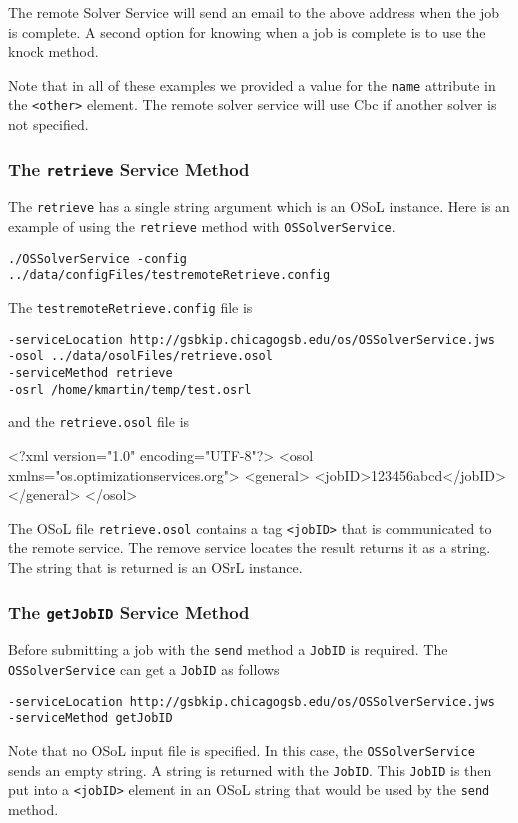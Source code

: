 \documentclass[11pt]{article}
\renewcommand{\_}{{\char"5F}}
\renewcommand{\{}{{\char"7B}}
\renewcommand{\}}{{\char"7D}}
\renewcommand{\^}{{\char"0D}}
\renewcommand{\'}{{\char"0D}}
\begin{document}
The remote Solver Service will send an email to the above address when the job is complete. A second option for knowing when a job is complete is to use the knock method.

Note that in all of these examples we provided a value for the {\tt name} attribute in the {\tt <other>} element. The remote solver service will use Cbc if another solver is not specified.



\subsubsection{The  {\tt retrieve} Service Method}\label{section:retrieve}

The {\tt retrieve} has a single string argument which is an OSoL instance. Here is an example of using the {\tt retrieve} method with {\tt OSSolverService}.
\begin{verbatim}
./OSSolverService -config ../data/configFiles/testremoteRetrieve.config
\end{verbatim}
The {\tt testremoteRetrieve.config} file is
\begin{verbatim}
-serviceLocation http://gsbkip.chicagogsb.edu/os/OSSolverService.jws
-osol ../data/osolFiles/retrieve.osol
-serviceMethod retrieve
-osrl /home/kmartin/temp/test.osrl
\end{verbatim}
and the {\tt retrieve.osol} file is
\begin{verbatimtab}[4]
<?xml version="1.0" encoding="UTF-8"?>
<osol xmlns="os.optimizationservices.org">
 	<general>
 		<jobID>123456abcd</jobID>
	</general>
</osol>
\end{verbatimtab}
The OSoL file {\tt retrieve.osol} contains a tag {\tt <jobID>} that is communicated to the remote service. The remove service locates the result returns it as a string. The string that is returned is an OSrL instance.

\subsubsection{The  {\tt getJobID} Service Method}\label{section:getjobid}

Before  submitting a job with the {\tt send} method a {\tt JobID} is required. The {\tt OSSolverService} can get a {\tt JobID} as follows
\begin{verbatim}
-serviceLocation http://gsbkip.chicagogsb.edu/os/OSSolverService.jws
-serviceMethod getJobID
\end{verbatim}
Note that no OSoL input file is specified. In this case, the {\tt OSSolverService} sends an empty string. A string is returned with the {\tt JobID}. This {\tt JobID} is then put into a {\tt <jobID>} element in an OSoL string that would be used by the {\tt send} method.
\end{document}
